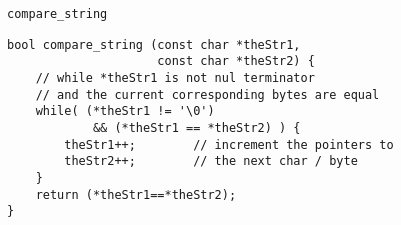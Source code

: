 \begin{frame}[fragile,label=cmpStrC]{\texttt{compare\_string}}
\lstset{
    language=C++,
    style=small,
}
\begin{lstlisting}
bool compare_string (const char *theStr1, 
                     const char *theStr2) {
    // while *theStr1 is not nul terminator
    // and the current corresponding bytes are equal
    while( (*theStr1 != '\0') 
            && (*theStr1 == *theStr2) ) {
        theStr1++;        // increment the pointers to 
        theStr2++;        // the next char / byte
    }
    return (*theStr1==*theStr2);
}
\end{lstlisting}
\end{frame}

